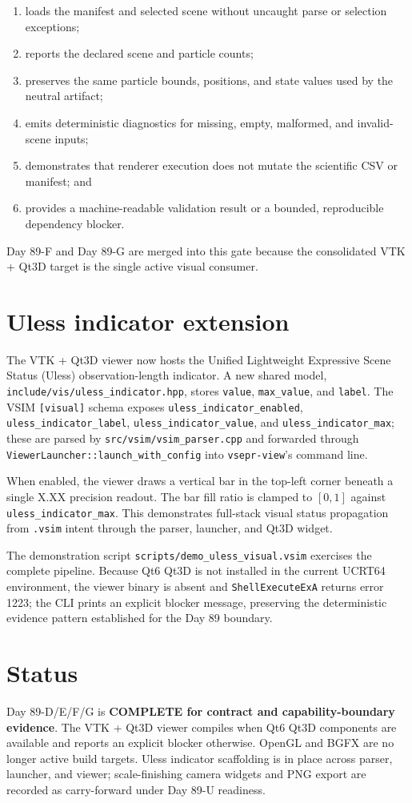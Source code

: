 \documentclass[11pt]{article}
\begin{document}
\begin{enumerate}
\item loads the manifest and selected scene without uncaught parse or selection exceptions;
\item reports the declared scene and particle counts;
\item preserves the same particle bounds, positions, and state values used by the neutral artifact;
\item emits deterministic diagnostics for missing, empty, malformed, and invalid-scene inputs;
\item demonstrates that renderer execution does not mutate the scientific CSV or manifest; and
\item provides a machine-readable validation result or a bounded, reproducible dependency blocker.
\end{enumerate}

Day 89-F and Day 89-G are merged into this gate because the consolidated VTK + Qt3D target is the single active visual consumer.

\section*{Uless indicator extension}
The VTK + Qt3D viewer now hosts the Unified Lightweight Expressive Scene Status (Uless) observation-length indicator. A new shared model, \texttt{include/vis/uless\_indicator.hpp}, stores \texttt{value}, \texttt{max\_value}, and \texttt{label}. The VSIM \texttt{[visual]} schema exposes \texttt{uless\_indicator\_enabled}, \texttt{uless\_indicator\_label}, \texttt{uless\_indicator\_value}, and \texttt{uless\_indicator\_max}; these are parsed by \texttt{src/vsim/vsim\_parser.cpp} and forwarded through \texttt{ViewerLauncher::launch\_with\_config} into \texttt{vsepr-view}'s command line.

When enabled, the viewer draws a vertical bar in the top-left corner beneath a single X.XX precision readout. The bar fill ratio is clamped to $[0,1]$ against \texttt{uless\_indicator\_max}. This demonstrates full-stack visual status propagation from \texttt{.vsim} intent through the parser, launcher, and Qt3D widget.

The demonstration script \texttt{scripts/demo\_uless\_visual.vsim} exercises the complete pipeline. Because Qt6 Qt3D is not installed in the current UCRT64 environment, the viewer binary is absent and \texttt{ShellExecuteExA} returns error 1223; the CLI prints an explicit blocker message, preserving the deterministic evidence pattern established for the Day 89 boundary.

\section*{Status}
Day 89-D/E/F/G is \textbf{COMPLETE for contract and capability-boundary evidence}. The VTK + Qt3D viewer compiles when Qt6 Qt3D components are available and reports an explicit blocker otherwise. OpenGL and BGFX are no longer active build targets. Uless indicator scaffolding is in place across parser, launcher, and viewer; scale-finishing camera widgets and PNG export are recorded as carry-forward under Day 89-U readiness.
\end{document}
